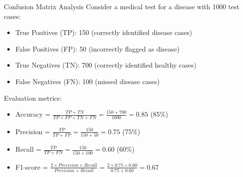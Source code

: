 \begin{example}{Confusion Matrix Analysis}
Consider a medical test for a disease with 1000 test cases:
\begin{itemize}
    \item True Positives (TP): 150 (correctly identified disease cases)
    \item False Positives (FP): 50 (incorrectly flagged as disease)
    \item True Negatives (TN): 700 (correctly identified healthy cases)
    \item False Negatives (FN): 100 (missed disease cases)
\end{itemize}

Evaluation metrics:
\begin{itemize}
    \item Accuracy = $\frac{TP+TN}{TP+FP+TN+FN} = \frac{150+700}{1000} = 0.85$ (85\%)
    \item Precision = $\frac{TP}{TP+FP} = \frac{150}{150+50} = 0.75$ (75\%)
    \item Recall = $\frac{TP}{TP+FN} = \frac{150}{150+100} = 0.60$ (60\%)
    \item F1-score = $\frac{2 \times Precision \times Recall}{Precision + Recall} = \frac{2 \times 0.75 \times 0.60}{0.75 + 0.60} = 0.67$
\end{itemize}
\end{example}